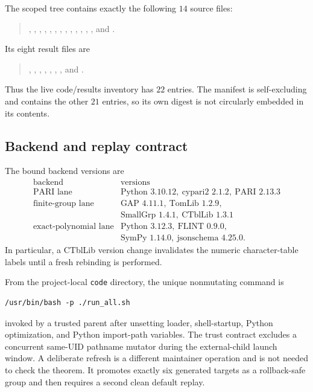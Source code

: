 The scoped tree contains exactly the following $14$ source files:
\begin{quote}\small
{}, ,
, ,
, ,
, ,
, ,
, ,
, and .
\end{quote}
Its eight result files are
\begin{quote}\small
{}, ,
,
, ,
, , and
.
\end{quote}
Thus the live code/results inventory has $22$ entries.  The manifest is
self-excluding and contains the other $21$ entries, so its own digest is not
circularly embedded in its contents.

\subsection{Backend and replay contract}

The bound backend versions are
\[
\begin{array}{c|l}
\text{backend}&\text{versions}\\ \hline
\text{PARI lane}&\text{Python }3.10.12,\ \text{cypari2 }2.1.2,\
                   \text{PARI }2.13.3\\
\text{finite-group lane}&\text{GAP }4.11.1,\ \text{TomLib }1.2.9,\\
&\text{SmallGrp }1.4.1,\ \text{CTblLib }1.3.1\\
\text{exact-polynomial lane}&\text{Python }3.12.3,\ \text{FLINT }0.9.0,\\
&\text{SymPy }1.14.0,\ \text{jsonschema }4.25.0.
\end{array}
\]
In particular, a CTblLib version change invalidates the numeric
character-table labels until a fresh rebinding is performed.

From the project-local \texttt{code} directory, the unique nonmutating
command is
\begin{verbatim}
/usr/bin/bash -p ./run_all.sh
\end{verbatim}
invoked by a trusted parent after unsetting loader, shell-startup, Python
optimization, and Python import-path variables.  The trust contract excludes
a concurrent same-UID pathname mutator during the external-child launch
window.  A deliberate refresh is a different maintainer operation and is not
needed to check the theorem.  It promotes exactly six generated targets as a
rollback-safe group and then requires a second clean default replay.

